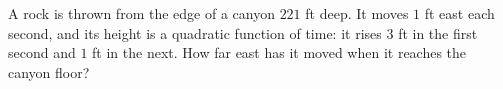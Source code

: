 A rock is thrown from the edge of a canyon $221$ ft deep. It moves $1$ ft east each second, and its height is a quadratic function of time: it rises $3$ ft in the first second and $1$ ft in the next. How far east has it moved when it reaches the canyon floor?
